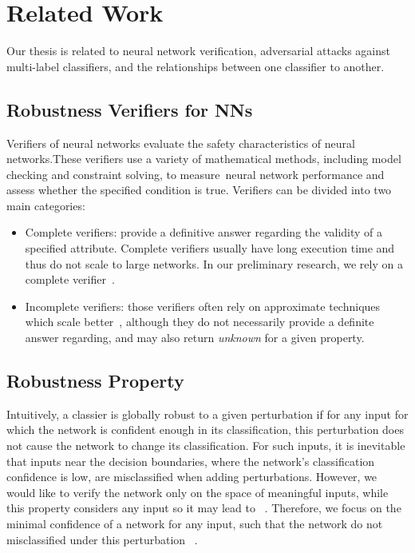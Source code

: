 
\section{Related Work}
Our thesis is related to neural network verification, adversarial attacks against multi-label classifiers, and the relationships between one classifier to another.

\subsection{Robustness Verifiers for NNs}\label{subsec:verifiers}
Verifiers of neural networks evaluate the safety characteristics of neural networks.These verifiers use a variety of mathematical methods, including model checking and constraint solving, to measure neural network performance and assess whether the specified condition is true. Verifiers can be divided into two main categories:
\begin{itemize}
    \item  Complete verifiers: provide a definitive answer regarding the validity of a specified attribute.
    Complete verifiers usually have long execution time and thus do not scale to large networks.
        In our preliminary research, we rely on a complete verifier~\cite{MIPVERIFY}.
    \item Incomplete verifiers: those verifiers often rely on approximate techniques which scale better~\cite{INCOMPLETE1, INCOMPLETE2}, although they do not necessarily provide a definite answer regarding, and may also return \emph{unknown} for a given property. 
\end{itemize}

\subsection{Robustness Property}
Intuitively, a classier is globally robust to a given perturbation if for any input for which the network is confident enough in its classification, this perturbation does not cause the network to change its classification. For such inputs, it is inevitable that inputs near the decision boundaries, where the network’s classification confidence is low, are misclassified when adding perturbations. However, we would like to verify the network only on the space of meaningful inputs, while this property considers any input so it may lead to ~\cite{Reluplex}. Therefore, we focus on the minimal confidence of a network for any input, such that the network do not misclassified under this perturbation ~\cite{VHAGAR}.
     
